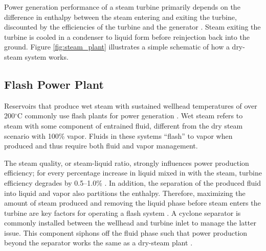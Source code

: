Power generation performance of a steam turbine primarily depends on the difference in enthalpy between the steam entering and exiting the turbine, discounted by the efficiencies of the turbine \citep[generally > 85\%,][p. 206]{glassley_geothermal_2015} and the generator \citep[$\approx98\%$,][p.\ 116]{augustine_hydrothermal_2009}. Steam exiting the turbine is cooled in a condenser to liquid form before reinjection back into the ground. Figure \ref{fig:steam_plant} illustrates a simple schematic of how a dry-steam system works.

\subsection{Flash Power Plant}\label{ch2:flash_plant}

Reservoirs that produce wet steam with sustained wellhead temperatures of over 200$^\circ$C commonly use flash plants for power generation \citep{moore_more_2013}. Wet steam refers to steam with some component of entrained fluid, different from the dry steam scenario with 100\% vapor. Fluids in these systems “flash” to vapor when produced and thus require both fluid and vapor management. 

The steam quality, or steam-liquid ratio, strongly influences power production efficiency; for every percentage increase in liquid mixed in with the steam, turbine efficiency degrades by 0.5--1.0\% \citep[Baumann Rule,][p.\ 207]{glassley_geothermal_2015}. In addition, the separation of the produced fluid into liquid and vapor also partitions the enthalpy. Therefore, maximizing the amount of steam produced and removing the liquid phase before steam enters the turbine are key factors for operating a flash system \citep[p.\ 215--216]{glassley_geothermal_2015}. A cyclone separator is commonly installed between the wellhead and turbine inlet to manage the latter issue. This component siphons off the fluid phase such that power production beyond the separator works the same as a dry-steam plant \citep[p.\ 88]{dipippo_geothermal_2012}.

